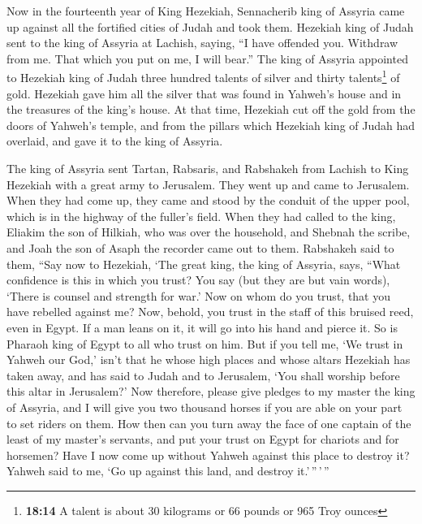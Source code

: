  Now in the fourteenth year of King Hezekiah, Sennacherib
king of Assyria came up against all the fortified cities of Judah and
took them.  Hezekiah king of Judah sent to the king of
Assyria at Lachish, saying, ``I have offended you. Withdraw from me.
That which you put on me, I will bear.'' The king of Assyria appointed
to Hezekiah king of Judah three hundred talents of silver and thirty
talents\footnote{\textbf{18:14} A talent is about 30 kilograms or 66
  pounds or 965 Troy ounces} of gold.  Hezekiah gave him
all the silver that was found in Yahweh's house and in the treasures of
the king's house.  At that time, Hezekiah cut off the
gold from the doors of Yahweh's temple, and from the pillars which
Hezekiah king of Judah had overlaid, and gave it to the king of Assyria.

 The king of Assyria sent Tartan, Rabsaris, and Rabshakeh
from Lachish to King Hezekiah with a great army to Jerusalem. They went
up and came to Jerusalem. When they had come up, they came and stood by
the conduit of the upper pool, which is in the highway of the fuller's
field.  When they had called to the king, Eliakim the son
of Hilkiah, who was over the household, and Shebnah the scribe, and Joah
the son of Asaph the recorder came out to them. 
Rabshakeh said to them, ``Say now to Hezekiah, `The great king, the king
of Assyria, says, ``What confidence is this in which you trust?
 You say (but they are but vain words), `There is counsel
and strength for war.' Now on whom do you trust, that you have rebelled
against me?  Now, behold, you trust in the staff of this
bruised reed, even in Egypt. If a man leans on it, it will go into his
hand and pierce it. So is Pharaoh king of Egypt to all who trust on him.
 But if you tell me, `We trust in Yahweh our God,' isn't
that he whose high places and whose altars Hezekiah has taken away, and
has said to Judah and to Jerusalem, `You shall worship before this altar
in Jerusalem?'  Now therefore, please give pledges to my
master the king of Assyria, and I will give you two thousand horses if
you are able on your part to set riders on them.  How
then can you turn away the face of one captain of the least of my
master's servants, and put your trust on Egypt for chariots and for
horsemen?  Have I now come up without Yahweh against this
place to destroy it? Yahweh said to me, `Go up against this land, and
destroy it.'\,''\,'\,''

